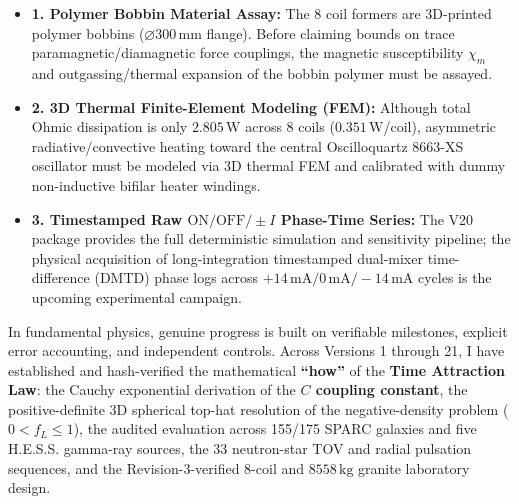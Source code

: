 \documentclass[10pt,a4paper]{article}
\begin{document}
{
\begin{itemize}\setlength{\itemsep}{1pt}\setlength{\parskip}{0pt}\setlength{\topsep}{1pt}
  \item \textbf{1. Polymer Bobbin Material Assay:} The 8 coil formers are 3D-printed polymer bobbins ($\varnothing 300\,\text{mm}$ flange). Before claiming bounds on trace paramagnetic/diamagnetic force couplings, the magnetic susceptibility $\chi_m$ and outgassing/thermal expansion of the bobbin polymer must be assayed.
  \item \textbf{2. 3D Thermal Finite-Element Modeling (FEM):} Although total Ohmic dissipation is only $2.805\,\text{W}$ across 8 coils ($0.351\,\text{W}$/coil), asymmetric radiative/convective heating toward the central Oscilloquartz 8663-XS oscillator must be modeled via 3D thermal FEM and calibrated with dummy non-inductive bifilar heater windings.
  \item \textbf{3. Timestamped Raw $\text{ON}/\text{OFF}/\pm I$ Phase-Time Series:} The V20 package provides the full deterministic simulation and sensitivity pipeline; the physical acquisition of long-integration timestamped dual-mixer time-difference (DMTD) phase logs across $+14\,\text{mA} / 0\,\text{mA} / -14\,\text{mA}$ cycles is the upcoming experimental campaign.
\end{itemize}

\vspace{0.5mm}
\noindent{\color{navy}\rule{\linewidth}{0.6pt}}\par\vspace{0.8mm}
\par\vspace{0.5pt}
In fundamental physics, genuine progress is built on verifiable milestones, explicit error accounting, and independent controls. Across Versions 1 through 21, I have established and hash-verified the mathematical \textbf{``how''} of the \textbf{Time Attraction Law}: the Cauchy exponential derivation of the \textbf{$C$ coupling constant}, the positive-definite 3D spherical top-hat resolution of the negative-density problem ($0 < f_L \le 1$), the audited evaluation across 155/175 SPARC galaxies and five H.E.S.S. gamma-ray sources, the 33 neutron-star TOV and radial pulsation sequences, and the Revision-3-verified 8-coil and $8558\,\text{kg}$ granite laboratory design.

}
\end{document}
